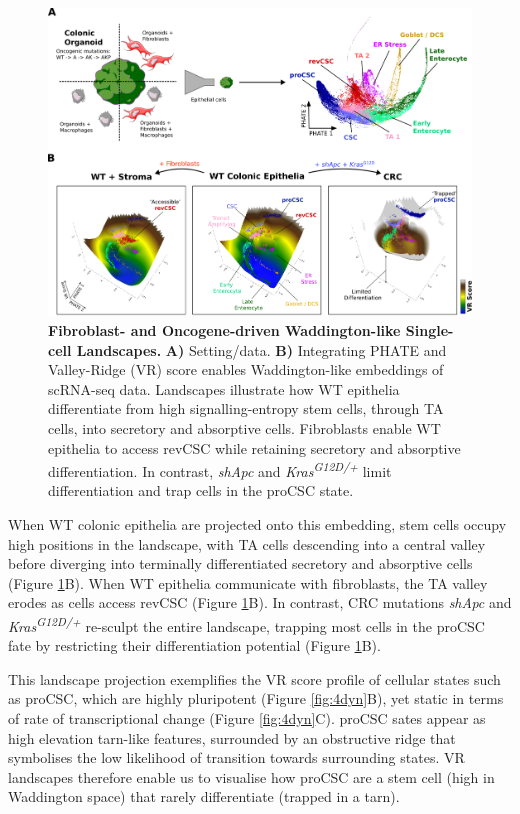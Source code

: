 \begin{figure}[h]
    \centering
    \includegraphics{05vr/figs/5VR_landscape.png}
    \caption{\textbf{Fibroblast- and Oncogene-driven Waddington-like Single-cell Landscapes.} \textbf{A)} Setting/data. \textbf{B)} Integrating PHATE and Valley-Ridge (VR) score enables Waddington-like embeddings of scRNA-seq data. Landscapes illustrate how WT epithelia differentiate from high signalling-entropy stem cells, through TA cells, into secretory and absorptive cells. Fibroblasts enable WT epithelia to access revCSC while retaining secretory and absorptive differentiation. In contrast, \textit{shApc} and \textit{Kras\textsuperscript{G12D/+}} limit differentiation and trap cells in the proCSC state.}
    \label{fig:5land}
\end{figure}

When WT colonic epithelia are projected onto this embedding, stem cells occupy high positions in the landscape, with TA cells descending into a central valley before diverging into terminally differentiated secretory and absorptive cells (Figure \ref{fig:5land}B). When WT epithelia communicate with fibroblasts, the TA valley erodes as cells access revCSC (Figure \ref{fig:5land}B). In contrast, CRC mutations \textit{shApc} and \textit{Kras\textsuperscript{G12D/+}} re-sculpt the entire landscape, trapping most cells in the proCSC fate by restricting their differentiation potential (Figure \ref{fig:5land}B). 

This landscape projection exemplifies the VR score profile of cellular states such as proCSC, which are highly pluripotent (Figure \ref{fig:4dyn}B), yet static in terms of rate of transcriptional change (Figure \ref{fig:4dyn}C). proCSC sates appear as high elevation tarn-like features, surrounded by an obstructive ridge that symbolises the low likelihood of transition towards surrounding states. VR landscapes therefore enable us to visualise how proCSC are a stem cell (high in Waddington space) that rarely differentiate (trapped in a tarn). 

